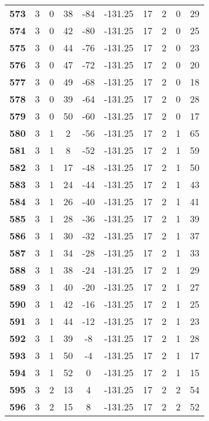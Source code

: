 \documentclass{article}%
\begin{document}
\begin{longtable}{cccccccccc}
        \textbf{573} & 3 & 0 & 38 & -84 & -131.25 & 17 & 2 & 0 & 29 \\ 
        \textbf{574} & 3 & 0 & 42 & -80 & -131.25 & 17 & 2 & 0 & 25 \\ 
        \textbf{575} & 3 & 0 & 44 & -76 & -131.25 & 17 & 2 & 0 & 23 \\ 
        \textbf{576} & 3 & 0 & 47 & -72 & -131.25 & 17 & 2 & 0 & 20 \\ 
        \textbf{577} & 3 & 0 & 49 & -68 & -131.25 & 17 & 2 & 0 & 18 \\ 
        \textbf{578} & 3 & 0 & 39 & -64 & -131.25 & 17 & 2 & 0 & 28 \\ 
        \textbf{579} & 3 & 0 & 50 & -60 & -131.25 & 17 & 2 & 0 & 17 \\ 
        \textbf{580} & 3 & 1 & 2 & -56 & -131.25 & 17 & 2 & 1 & 65 \\ 
        \textbf{581} & 3 & 1 & 8 & -52 & -131.25 & 17 & 2 & 1 & 59 \\ 
        \textbf{582} & 3 & 1 & 17 & -48 & -131.25 & 17 & 2 & 1 & 50 \\ 
        \textbf{583} & 3 & 1 & 24 & -44 & -131.25 & 17 & 2 & 1 & 43 \\ 
        \textbf{584} & 3 & 1 & 26 & -40 & -131.25 & 17 & 2 & 1 & 41 \\ 
        \textbf{585} & 3 & 1 & 28 & -36 & -131.25 & 17 & 2 & 1 & 39 \\ 
        \textbf{586} & 3 & 1 & 30 & -32 & -131.25 & 17 & 2 & 1 & 37 \\ 
        \textbf{587} & 3 & 1 & 34 & -28 & -131.25 & 17 & 2 & 1 & 33 \\ 
        \textbf{588} & 3 & 1 & 38 & -24 & -131.25 & 17 & 2 & 1 & 29 \\ 
        \textbf{589} & 3 & 1 & 40 & -20 & -131.25 & 17 & 2 & 1 & 27 \\ 
        \textbf{590} & 3 & 1 & 42 & -16 & -131.25 & 17 & 2 & 1 & 25 \\ 
        \textbf{591} & 3 & 1 & 44 & -12 & -131.25 & 17 & 2 & 1 & 23 \\ 
        \textbf{592} & 3 & 1 & 39 & -8 & -131.25 & 17 & 2 & 1 & 28 \\ 
        \textbf{593} & 3 & 1 & 50 & -4 & -131.25 & 17 & 2 & 1 & 17 \\ 
        \textbf{594} & 3 & 1 & 52 & 0 & -131.25 & 17 & 2 & 1 & 15 \\ 
        \textbf{595} & 3 & 2 & 13 & 4 & -131.25 & 17 & 2 & 2 & 54 \\ 
        \textbf{596} & 3 & 2 & 15 & 8 & -131.25 & 17 & 2 & 2 & 52 \\ 

\end{longtable}
\end{document}
